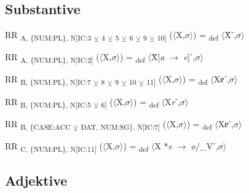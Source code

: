 {\subsection{Substantive}

\begin{exe}
 RR \textsubscript{A, \{NUM:PL\}, N[IC:3} \textsubscript{${\veebar}$}\textsubscript{ 4} \textsubscript{${\veebar}$}\textsubscript{ 5} \textsubscript{${\veebar}$}\textsubscript{ 6} \textsubscript{${\veebar}$}\textsubscript{ 9} \textsubscript{${\veebar}$}\textsubscript{ 10]} ($\langle$X,$\sigma $$\rangle$) = \textsubscript{def} $\langle$Ẍˊ,$\sigma $$\rangle$
\end{exe}

\begin{exe}
 RR \textsubscript{A, \{NUM:PL\}, N[IC:2]} ($\langle$X,$\sigma $$\rangle$) = \textsubscript{def} $\langle$Ẍ[\textit{a} $\rightarrow$ \textit{e}]ˊ,$\sigma $$\rangle$
\end{exe}

\begin{exe}
 RR \textsubscript{B, \{NUM:PL\}, N[IC:7} \textsubscript{${\veebar}$}\textsubscript{ 8} \textsubscript{${\veebar}$}\textsubscript{ 9} \textsubscript{${\veebar}$}\textsubscript{ 10} \textsubscript{${\veebar}$}\textsubscript{ 11]} ($\langle$X,$\sigma $$\rangle$) = \textsubscript{def} $\langle$X\textit{ɐ}ˊ,$\sigma $$\rangle$
\end{exe}

\begin{exe}
 RR \textsubscript{B, \{NUM:PL\}, N[IC:5} \textsubscript{${\veebar}$}\textsubscript{ 6]} ($\langle$X,$\sigma $$\rangle$) = \textsubscript{def} $\langle$X\textit{r}ˊ,$\sigma $$\rangle$
\end{exe}

\begin{exe}
 RR \textsubscript{B, \{CASE:ACC} \textsubscript{${\veebar}$}\textsubscript{ DAT, NUM:SG\}, N[IC:7]} ($\langle$X,$\sigma $$\rangle$) = \textsubscript{def} $\langle$X\textit{ɐ}ˊ,$\sigma $$\rangle$
\end{exe}

\begin{exe}
 RR \textsubscript{C, \{NUM:PL\}, N[IC:11]} ($\langle$X,$\sigma $$\rangle$) = \textsubscript{def} $\langle$X *\textit{e} $\rightarrow$ ø/\_Vˊ,$\sigma $$\rangle$
\end{exe}

\subsection{Adjektive}

}
